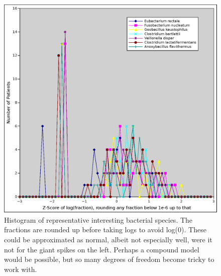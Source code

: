 \documentclass[letterpaper]{article}
\begin{document}
\begin{figure}[h!]
  \includegraphics[width=\textwidth]{nonnormal}
  \caption{Histogram of representative interesting bacterial species.
    The fractions are rounded up before taking logs to avoid log(0).
    These could be approximated as normal, albeit not especially well,
    were it not for the giant spikes on the left.  Perhaps a compound
    model would be possible, but so many degrees of freedom become
    tricky to work with.}
  \label{nonnormal}
\end{figure}
  
\end{document}
